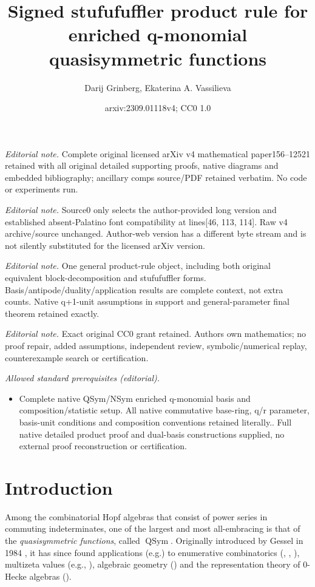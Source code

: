 \documentclass[numbers=enddot,12pt,final,onecolumn,notitlepage]{scrartcl}%
\title{Signed stufufuffler product rule for enriched q-monomial quasisymmetric functions}
\author{Darij Grinberg, Ekaterina A. Vassilieva}
\date{arxiv:2309.01118v4; CC0 1.0}
\theoremstyle{definition}
\begin{document}
\maketitle
\noindent\textit{Editorial note.} Complete original licensed arXiv v4 mathematical paper156--12521 retained with all original detailed supporting proofs, native diagrams and embedded bibliography; ancillary comps source/PDF retained verbatim. No code or experiments run.\par\medskip
\noindent\textit{Editorial note.} Source0 only selects the author-provided long version and established absent-Palatino font compatibility at lines[46, 113, 114]. Raw v4 archive/source unchanged. Author-web version has a different byte stream and is not silently substituted for the licensed arXiv version.\par\medskip
\noindent\textit{Editorial note.} One general product-rule object, including both original equivalent block-decomposition and stufufuffler forms. Basis/antipode/duality/application results are complete context, not extra counts. Native q+1-unit assumptions in support and general-parameter final theorem retained exactly.\par\medskip
\noindent\textit{Editorial note.} Exact original CC0 grant retained. Authors own mathematics; no proof repair, added assumptions, independent review, symbolic/numerical replay, counterexample search or certification.\par\medskip
\noindent\textit{Allowed standard prerequisites (editorial).}\begin{itemize}
\item Complete native QSym/NSym enriched q-monomial basis and composition/statistic setup. All native commutative base-ring, q/r parameter, basis-unit conditions and composition conventions retained literally.. Full native detailed product proof and dual-basis constructions supplied, no external proof reconstruction or certification.
\end{itemize}\medskip
\section{\label{sec.intro}Introduction}

Among the combinatorial Hopf algebras that consist of power series in
commuting indeterminates, one of the largest and most all-embracing is that of
the \textit{quasisymmetric functions}, called $\operatorname*{QSym}$.
Originally introduced by Gessel in 1984 \cite{Gessel84}, it has since found
applications (e.g.) to enumerative combinatorics (\cite[Chapter 8]{Sagan20},
\cite[\S 7.19--7.23]{Stanley-EC2}, \cite{GesZhu18}), multizeta values (e.g.,
\cite{Hoffma15}), algebraic geometry (\cite{Oesing18}) and the representation
theory of $0$-Hecke algebras (\cite[\S 6.2]{Meliot17}).
\end{document}
